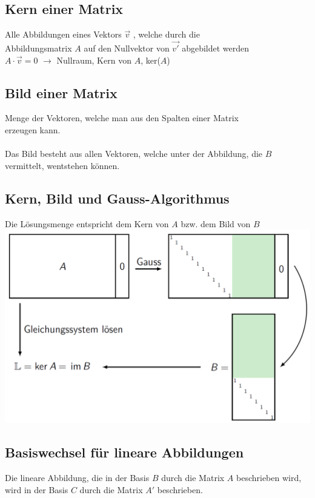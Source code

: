 		  	
		  	\subsection{Kern einer Matrix}		
			Alle Abbildungen eines Vektors $\vec{v}$ , welche durch die \\
			Abbildungsmatrix $A$ auf den Nullvektor von $\vec{v'}$ abgebildet werden \\
			$A \cdot \vec{v} = 0 $ $\rightarrow$ Nullraum, Kern von $A$, ker($A$) 
			
			
			\subsection{Bild einer Matrix}		
			Menge der Vektoren, welche man aus den Spalten einer Matrix \\
			erzeugen kann.\\
			\\
			Das Bild besteht aus allen Vektoren, welche unter der Abbildung, die $B$ vermittelt, wentstehen können.
			
			
			\vfill\null
			\columnbreak
			
			
			
			\subsection{Kern, Bild und Gauss-Algorithmus}	
			Die Lösungsmenge entspricht dem Kern von $A$ bzw. dem Bild von $B$ \\	
			\includegraphics[width=0.55\linewidth]{Bilder/kern-bild-gauss} 	
			
			
			\subsection{Basiswechsel für lineare Abbildungen}
			Die lineare Abbildung, die in der Basis $B$ durch die Matrix $A$ beschrieben wird, wird in der Basis $C$ durch die Matrix $A'$ beschrieben.\\
			
